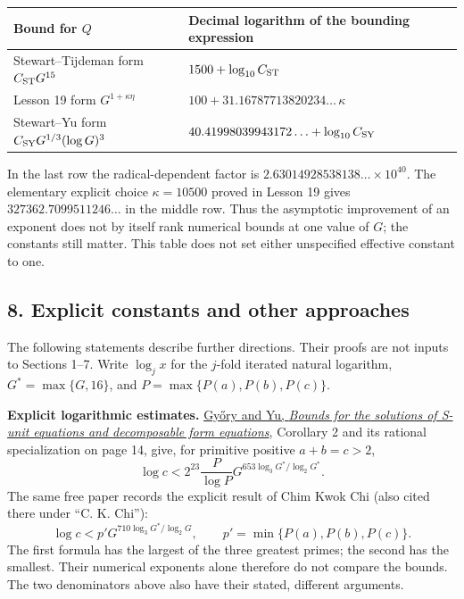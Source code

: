 \documentclass[
  11pt,
  a4paper,
]{article}
\newcounter{none} %
\begin{document}
{\def\LTcaptype{none} %
\begin{longtable}[]{@{}
  >{\raggedright\arraybackslash}p{}
  >{\raggedright\arraybackslash}p{}@{}}
\toprule\noalign{}
\begin{minipage}[b]{\linewidth}\raggedright
Bound for \(Q\)
\end{minipage} & \begin{minipage}[b]{\linewidth}\raggedright
Decimal logarithm of the bounding expression
\end{minipage} \\
\midrule\noalign{}
\endhead
\bottomrule\noalign{}
\endlastfoot
Stewart--Tijdeman form \(C_{\rm ST}G^{15}\) &
\(1500+\log_{10}C_{\rm ST}\) \\
Lesson 19 form \(G^{1+\kappa\eta}\) &
\(100+31.16787713820234\ldots\,\kappa\) \\
Stewart--Yu form \(C_{\rm SY}G^{1/3}(\log G)^3\) &
\(40.41998039943172\ldots+\log_{10}C_{\rm SY}\) \\
\end{longtable}
}

In the last row the radical-dependent factor is
\(2.63014928538138\ldots\times10^{40}\). The elementary explicit choice
\(\kappa=10500\) proved in Lesson 19 gives \(327362.7099511246\ldots\)
in the middle row. Thus the asymptotic improvement of an exponent does
not by itself rank numerical bounds at one value of \(G\); the constants
still matter. This table does not set either unspecified effective
constant to one.

\subsection{8. Explicit constants and other
approaches}\label{explicit-constants-and-other-approaches}

The following statements describe further directions. Their proofs are
not inputs to Sections 1--7. Write \(\log_j x\) for the \(j\)-fold
iterated natural logarithm, \(G^*=\max\{G,16\}\), and
\(P=\max\{P(a),P(b),P(c)\}\).

\textbf{Explicit logarithmic estimates.}
\href{https://www.impan.pl/shop/en/publication/transaction/download/product/83173}{Győry
and Yu, \emph{Bounds for the solutions of S-unit equations and
decomposable form equations}}, Corollary 2 and its rational
specialization on page 14, give, for primitive positive \(a+b=c>2\), \[
 \log c<2^{23}\frac{P}{\log P}
             G^{653\log_3G^*/\log_2G^*}.
\] The same free paper records the explicit result of Chim Kwok Chi
(also cited there under ``C. K. Chi''): \[
 \log c<p'G^{710\log_3G^*/\log_2G},
 \qquad p'=\min\{P(a),P(b),P(c)\}.
\] The first formula has the largest of the three greatest primes; the
second has the smallest. Their numerical exponents alone therefore do
not compare the bounds. The two denominators above also have their
stated, different arguments.
\end{document}
